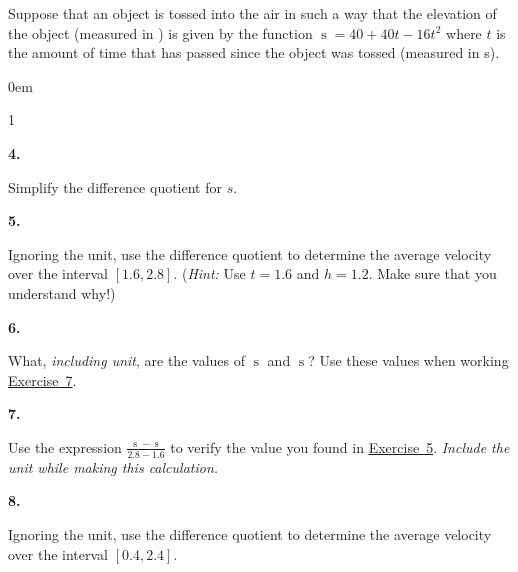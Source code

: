 \documentclass[12pt,]{book}
\theoremstyle{plain}
\theoremstyle{definition}
\numberwithin{equation}{section}
\newenvironment{exercisegroup}%
{\medskip\noindent}%
{\par\bigskip}%
\newlength{\exercisegroupindent}%
\newlength{\exercisegroupitemwidth}%
\newenvironment{exercisegrouplist}%
{\vspace{-\partopsep}%
\begin{adjustwidth}{\exercisegroupindent}{0em}}%
{\end{adjustwidth}%
\vspace{-\partopsep}%
\vspace{\baselineskip}}%
\newenvironment{exercisegroupbycol}[1]%
{\begin{exercisegrouplist}%
\vspace{-\multicolsep}%
\begin{multicols}{#1}%
\setlength{\parindent}{0em}%
\setlength{\exercisegroupitemwidth}{\linewidth}}%
{\end{multicols}%
\vspace{-\multicolsep}%
\end{exercisegrouplist}}%
\newenvironment{exercisegroupitem}[1]%
{\begin{minipage}[t]{\exercisegroupitemwidth}
\vspace{0pt}%
{\bfseries#1}%
\rule{0pt}{\baselineskip}}{\strut%
\end{minipage}%
\hspace{\columnsep}}%
\providecommand\phantomsection{}
\newcommand{\fe}[2]{\mathop{{#1}{\left(#2\right)}}}
\newcommand{\cinterval}[2]{\left[#1,#2\right]}
\begin{document}
\begin{exercisegroup}%
Suppose that an object is tossed into the air in such a way that the elevation of the object (measured in \si{\foot}) is given by the function \(\fe{s}{t}=40+40t-16t^2\) where \(t\) is the amount of time that has passed since the object was tossed (measured in \si{\second}).%
\par
\begin{exercisegroupbycol}{1}%
\begin{exercisegroupitem}{4. }\phantomsection\hypertarget{exercise-12}{\null}
Simplify the difference quotient for \(s\).%
\end{exercisegroupitem}%
\par%
\begin{exercisegroupitem}{5. }\phantomsection\hypertarget{exercise-difference-quotient-average-velocity}{\null}
Ignoring the unit, use the difference quotient to determine the average velocity over the interval \(\cinterval{1.6}{2.8}\). (\emph{Hint:} Use \(t=1.6\) and \(h=1.2\). Make sure that you understand why!)%
\end{exercisegroupitem}%
\par%
\begin{exercisegroupitem}{6. }\phantomsection\hypertarget{exercise-14}{\null}
What, \emph{including unit}, are the values of \(\fe{s}{1.6}\) and \(\fe{s}{2.8}\)? Use these values when working \hyperref[exercise-difference-quotient-verify]{Exercise~7}.%
\end{exercisegroupitem}%
\par%
\begin{exercisegroupitem}{7. }\phantomsection\hypertarget{exercise-difference-quotient-verify}{\null}
Use the expression \(\frac{\fe{s}{2.8}-\fe{s}{1.6}}{2.8-1.6}\) to verify the value you found in \hyperref[exercise-difference-quotient-average-velocity]{Exercise~5}. \emph{Include the unit while making this calculation.}%
\end{exercisegroupitem}%
\par%
\begin{exercisegroupitem}{8. }\phantomsection\hypertarget{exercise-16}{\null}
Ignoring the unit, use the difference quotient to determine the average velocity over the interval \(\cinterval{0.4}{2.4}\).%
\end{exercisegroupitem}%
\par%
\end{exercisegroupbycol}%
\end{exercisegroup}%
\end{document}
